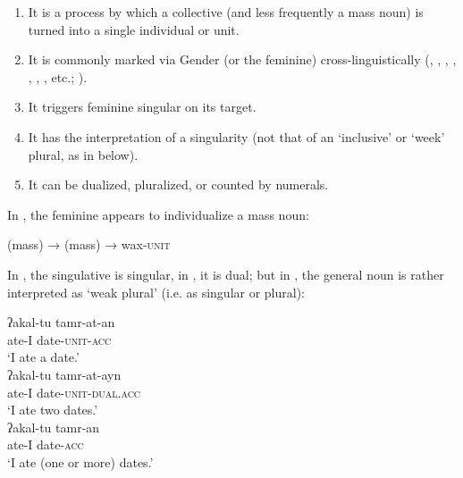 \begin{enumerate}
  \item It is a process by which a collective (and less frequently a mass noun) is turned into a single individual or unit.
  \item It is commonly marked via Gender (or the feminine) cross-linguistically (, , , , , , , etc.; \citealt[see e.g.][]{Mathieu2013}).
  \item It triggers feminine singular  on its target.
  \item It has the interpretation of a singularity (not that of an `inclusive' or `week' plural, as in  below).
  \item It can be dualized, pluralized, or counted by numerals.
\end{enumerate}

In , the feminine appears to individualize a mass noun:

\begin{exe}
  \ex\label{ex:fassi:13}
  \begin{xlist}
    \ex\label{ex:fassi:13a}   (mass) → 
    \ex\label{ex:fassi:13b}   (mass) →  wax-\textsc{unit} 
  \end{xlist}
\end{exe}

In , the singulative is singular, in , it
is dual; but in , the general noun is rather interpreted as
`weak plural' (i.e. as singular or plural):

\begin{exe}
  \ex\label{ex:fassi:14}
  \begin{xlist}
    \ex\label{ex:fassi:14a}
    \gll ʔakal-tu tamr-at-an\\
    ate-I date-\textsc{unit-acc}\\
    \glt `I ate a date.'\\
    \ex\label{ex:fassi:14b}
    \gll ʔakal-tu tamr-at-ayn\\
    ate-I date-\textsc{unit-dual.acc}\\
    \glt `I ate two dates.'\\
    \ex\label{ex:fassi:14c}
    \gll ʔakal-tu tamr-an\\
    ate-I date-\textsc{acc}\\
    \glt `I ate (one or more) dates.'\\
  \end{xlist}
\end{exe}

